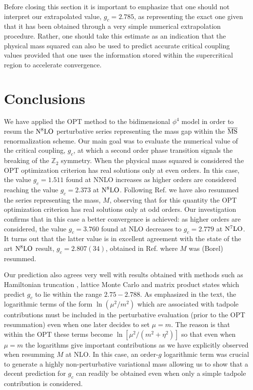 \documentclass[a4paper,11pt]{article}
\def\ms{\overline {\rm MS}}
\begin{document}
Before closing this section it is important to  emphasize  that one should not interpret our extrapolated value, $g_c =2.785$, as representing the exact one given that it has been obtained through a very simple numerical extrapolation procedure.  Rather, one should take this estimate as an indication that   the physical mass squared  
 can also be used to predict accurate critical coupling values provided that one uses the information stored within the supercritical region  to accelerate convergence. 








\section{Conclusions}

We have applied  the OPT method to the bidimensional $\phi^4$ model in order to resum the ${\rm N}^8{\rm LO}$ perturbative series representing the mass gap within the $\ms$ renormalization scheme. Our main goal was to evaluate the numerical value of the critical coupling, $g_c$, at which a second order phase transition signals the  breaking of the $\mathbb{Z}_2$ symmetry. When the physical mass squared  is considered the OPT optimization criterion has real solutions only at even orders. In this case, the value $g_c = 1.511$ found at NNLO increases as higher orders are considered reaching the value $g_c = 2.373$ at ${\rm N}^8{\rm LO}$. Following Ref.  \cite {serone1} we have also resummed the series representing the mass, $M$, observing that  for this quantity the OPT optimization criterion has real solutions only at odd orders. Our investigation confirms that in this case  a better convergence is achieved: as higher orders are considered,  the value $g_c = 3.760$ found at NLO decreases to $g_c = 2.779$ at ${\rm N}^7{\rm LO}$. It turns out that the latter value is in excellent agreement with the state of the art ${\rm N}^8{\rm LO}$ result, $g_c = 2.807(34)$, obtained in Ref.  \cite {serone1} where $M$ was (Borel) resummed. 

Our prediction also agrees very well with results obtained with methods such as Hamiltonian truncation \cite{hamilton1, hamilton3, hamilton7}, lattice Monte Carlo \cite{lattice5, lattice1} and matrix product states \cite {lattice2} which predict $g_c$ to lie within the range $ 2.75 - 2.788$.  As   emphasized in the text, the logarithmic terms of the form $\ln (\mu^2/m^2)$ which are associated with tadpole contributions  must be included in the perturbative evaluation (prior to the OPT resummation) even when one later decides to set $\mu=m$. The reason is that within the OPT these terms become $\ln [\mu^2/(m^2+\eta^2)]$ so that even when $\mu=m$ the logarithms give important contributions as we have explicitly observed when resumming $M$ at  NLO. In this case, an order-$g$ logarithmic term was crucial to generate a highly non-perturbative variational mass allowing us to show that a decent prediction for $g_c$ can readily be obtained even when only a simple tadpole contribution is considered.  
\end{document}
